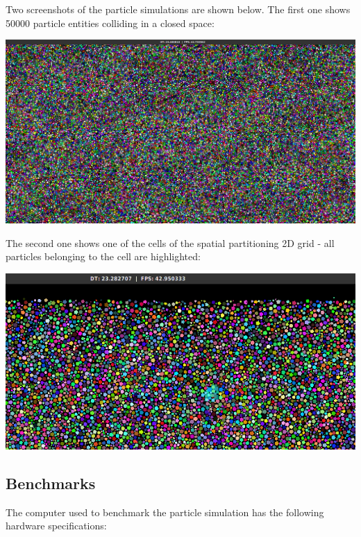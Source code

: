 \documentclass[oneside, 12pt, a4paper, openany]{book}
\let\origfigure=\figure
\let\endorigfigure=\endfigure
\renewenvironment{figure}[1][]{%
\origfigure[H]
}{%
\endorigfigure
}
\begin{document}
Two screenshots of the particle simulations are shown below. The first
one shows 50000 particle entities colliding in a closed space:

\begin{figure}[htbp]
\centering
\includegraphics{source/figures/bench/sc0.png}
\caption{Particle simulation: screenshot - 50000 colliding particles}
\end{figure}

The second one shows one of the cells of the spatial partitioning 2D
grid - all particles belonging to the cell are highlighted:

\begin{figure}[htbp]
\centering
\includegraphics{source/figures/bench/sc1.png}
\caption{Particle simulation: screenshot - spatial partitioning cell}
\end{figure}

\hypertarget{bench_particlesim}{\subsection{Benchmarks}\label{bench_particlesim}}

The computer used to benchmark the particle simulation has the following
hardware specifications:
\end{document}
